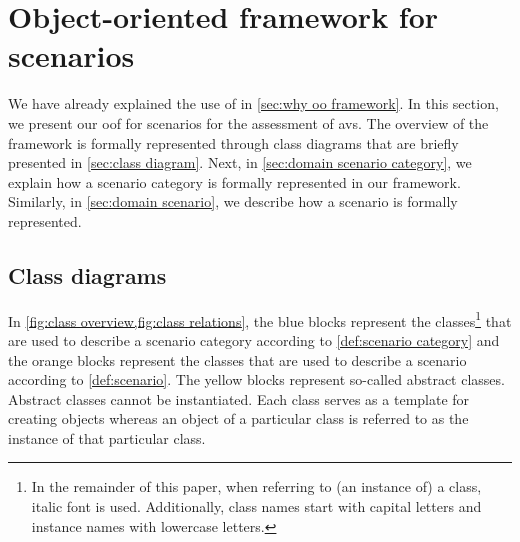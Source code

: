 \cstartb
\section{Object-oriented framework for scenarios}
\label{sec:oo framework}
\cendb

We have already explained the use of \cstartb {} \cendb in \cref{sec:why oo framework}. In this section, we present our \cstartb \ac{oof} \cendb for scenarios for the assessment of \acp{av}. 
The \cstartb overview of the framework \cendb is formally represented through \cstartb class diagrams \cendb that are briefly presented in \cref{sec:class diagram}. Next, in \cref{sec:domain scenario category}, we explain how a scenario category is formally represented \cstartb in our framework\cendb. Similarly, in \cref{sec:domain scenario}, we describe how a scenario is formally represented. 



\cstartb
\subsection{Class diagrams}\cendb
\label{sec:class diagram}

In \cref{fig:class overview,fig:class relations}, the blue blocks represent the classes\footnote{In the remainder of this paper, when referring to (an instance of) a class, italic font is used. \cstarte Additionally, class names start with capital letters and instance names with lowercase letters.\cende} that are used to describe a scenario category according to \cref{def:scenario category} and the orange blocks represent the classes that are used to describe a scenario according to \cref{def:scenario}. \cstartb The yellow blocks represent so-called abstract classes. Abstract classes cannot be instantiated. \cendb\cstartf Each class serves as a template for creating objects whereas an object of a particular class is referred to as the instance of that particular class. \cendf

